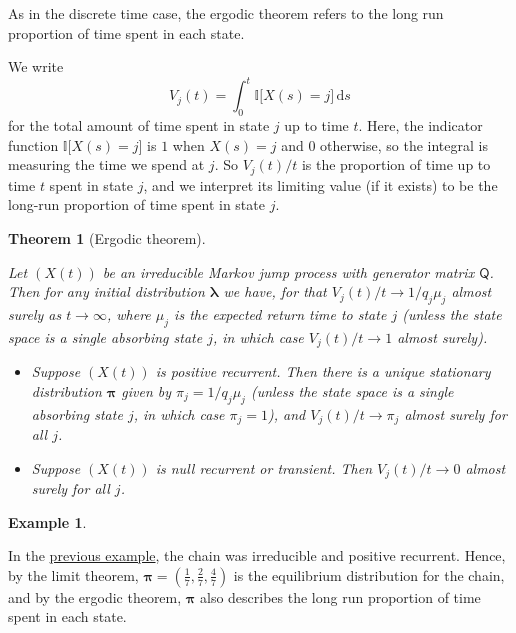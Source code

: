 \documentclass[
  a4paper,
]{article}
\providecommand{\tightlist}{%
  \setlength{\itemsep}{0pt}\setlength{\parskip}{0pt}}
\newtheorem{theorem}{Theorem}[section]
\theoremstyle{definition}
\theoremstyle{definition}
\newtheorem{example}{Example}[section]
\theoremstyle{definition}
\theoremstyle{remark}
\begin{document}
As in the discrete time case, the ergodic theorem refers to the long run proportion of time spent in each state.

We write
\[ V_j(t) = \int_0^t \mathbb{I}\big[X(s) = j\big]\, \mathrm ds \]
for the total amount of time spent in state \(j\) up to time \(t\).
Here, the indicator function \(\mathbb{I}\big[X(s) = j\big]\) is \(1\) when \(X(s) = j\) and \(0\) otherwise, so the integral is measuring the time we spend at \(j\). So \(V_j(t)/t\) is the proportion of time up to time \(t\) spent in state \(j\), and we interpret its limiting value (if it exists) to be the long-run proportion of time spent in state \(j\).

\begin{theorem}[Ergodic theorem]
\protect\hypertarget{thm:ergodic2}{}\label{thm:ergodic2}

Let \((X(t))\) be an irreducible Markov jump process with generator matrix \(\mathsf Q\). Then for any initial distribution \(\boldsymbol\lambda\) we have, for that \(V_j(t)/t \to 1/q_j\mu_j\) almost surely as \(t \to \infty\), where \(\mu_j\) is the expected return time to state \(j\) (unless the state space is a single absorbing state \(j\), in which case \(V_j(t)/t \to 1\) almost surely).

\begin{itemize}
\tightlist
\item
  Suppose \((X(t))\) is positive recurrent. Then there is a unique stationary distribution \(\boldsymbol\pi\) given by \(\pi_j = 1/q_j\mu_j\) (unless the state space is a single absorbing state \(j\), in which case \(\pi_j = 1\)), and \(V_j(t)/t \to \pi_j\) almost surely for all \(j\).
\item
  Suppose \((X(t))\) is null recurrent or transient. Then \(V_j(t)/t \to 0\) almost surely for all \(j\).
\end{itemize}

\end{theorem}

\begin{example}
\protect\hypertarget{exm:ergodic-ex-cont}{}\label{exm:ergodic-ex-cont}

In the \protect\hyperlink{stat-cont-ex}{previous example}, the chain was irreducible and positive recurrent. Hence, by the limit theorem, \(\boldsymbol\pi = (\frac17, \frac27, \frac47)\) is the equilibrium distribution for the chain, and by the ergodic theorem, \(\boldsymbol\pi\) also describes the long run proportion of time spent in each state.

\end{example}
\end{document}
